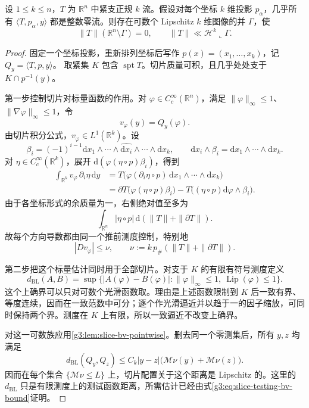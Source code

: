 \begin{proposition}\label{g3:prop:atomic-slice-graph-cover}
	设 \(1\le k\le n\)，\(T\) 为 \(\mathbb R^n\) 中紧支正规 \(k\) 流。假设对每个坐标 \(k\) 维投影 \(p_\alpha\)，几乎所有
	\(\langle T,p_\alpha,y\rangle\) 都是整数零流。则存在可数个 Lipschitz \(k\) 维图像的并 \(\Gamma\)，使
	\[
		\|T\|(\mathbb R^n\setminus\Gamma)=0,\qquad
		\|T\|\ll\mathcal H^k\llcorner\Gamma.
	\]
\end{proposition}
\begin{proof}
	固定一个坐标投影，重新排列坐标后写作
	\(p(x)=(x_1,\ldots,x_k)\)，记 \(Q_y=\langle T,p,y\rangle\)。
	取紧集 \(K\) 包含 \(\operatorname{spt}T\)。切片质量可积，且几乎处处支于 \(K\cap p^{-1}(y)\)。

	第一步控制切片对标量函数的作用。对
	\(\varphi\in C_c^\infty(\mathbb R^n)\)，满足
	\(\|\varphi\|_\infty\le1\)、\(\|\nabla\varphi\|_\infty\le1\)，令
	\[
		v_\varphi(y)=Q_y(\varphi).
	\]
	由切片积分公式，\(v_\varphi\in L^1(\mathbb R^k)\)。设
	\[
		\beta_i=(-1)^{i-1}\mathrm dx_1\wedge\cdots
		\wedge\widehat{\mathrm dx_i}\wedge\cdots\wedge\mathrm dx_k,
		\qquad
		\mathrm dx_i\wedge\beta_i=\mathrm dx_1\wedge\cdots\wedge\mathrm dx_k.
	\]
	对 \(\eta\in C_c^\infty(\mathbb R^k)\)，展开
	\(\mathrm d(\varphi(\eta\circ p)\beta_i)\)，得到
	\begin{align*}
		\int_{\mathbb R^k}v_\varphi\,\partial_i\eta\,\mathrm dy
		&=T\bigl(\varphi(\partial_i\eta\circ p)\,
		\mathrm dx_1\wedge\cdots\wedge\mathrm dx_k\bigr)\\
		&=\partial T\bigl(\varphi(\eta\circ p)\beta_i\bigr)
		-T\bigl((\eta\circ p)\mathrm d\varphi\wedge\beta_i\bigr).
	\end{align*}
	由于各坐标形式的余质量为一，右侧绝对值至多为
	\[
		\int_{\mathbb R^n}|\eta\circ p|\,\mathrm d(\|T\|+\|\partial T\|).
	\]
	故每个方向导数都由同一个推前测度控制，特别地
	\begin{equation}\label{g3:eq:slice-testing-bv-bound}
		|Dv_\varphi|\le\nu,\qquad
		\nu:=k\,p_\#(\|T\|+\|\partial T\|).
	\end{equation}

	第二步把这个标量估计同时用于全部切片。对支于 \(K\) 的有限有符号测度定义
	\[
		d_{\mathrm{BL}}(A,B)
		=\sup\{|A(\varphi)-B(\varphi)|:
		\|\varphi\|_\infty\le1,\ \operatorname{Lip}(\varphi)\le1\}.
	\]
	这个上确界可以只对可数个光滑函数取。理由是上述函数限制到 \(K\) 后一致有界、等度连续，因而在一致范数中可分；逐个作光滑逼近并以趋于一的因子缩放，可同时保持两个界。测度在 \(K\) 上有限，所以一致逼近不改变上确界。

	对这一可数族应用\cref{g3:lem:slice-bv-pointwise}。删去同一个零测集后，所有 \(y,z\) 均满足
	\begin{equation}\label{g3:eq:slice-configuration-lipschitz}
		d_{\mathrm{BL}}(Q_y,Q_z)
		\le C_k|y-z|\bigl(\mathcal M\nu(y)+\mathcal M\nu(z)\bigr).
	\end{equation}
	因而在每个集合 \(\{\mathcal M\nu\le L\}\) 上，切片配置关于这个距离是 Lipschitz 的。这里的 \(d_{\mathrm{BL}}\) 只是有限测度上的测试函数距离，所需估计已经由式\eqref{g3:eq:slice-testing-bv-bound}证明。


\end{proof}
